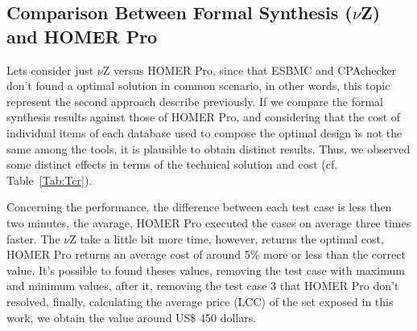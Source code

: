 \documentclass[10pt,journal,compsoc]{IEEEtran}
\begin{document}
\subsection{Comparison Between Formal Synthesis ($\nu$Z) and HOMER Pro}
\color{blue}
Lets consider just $\nu$Z versus HOMER Pro, since that ESBMC and CPAchecker don't found a optimal solution in common scenario, in other words, this topic represent the second approach describe previously. If we compare the formal synthesis results against those of HOMER Pro, and considering that the cost of individual items of each database used to compose the optimal design is not the same among the tools, it is plausible to obtain distinct results. Thus, we observed some distinct effects in terms of the technical solution and cost (cf. Table~\ref{Tab:Tcr}). 

Concerning the performance, the difference between each test case is less then two minutes, the avarage, HOMER Pro executed the cases on average three times faster. The $\nu$Z take a little bit more time, however, returns the optimal cost, HOMER Pro returns an average cost of around 5\% more or less than the correct value. It's possible to found theses values, removing the test case with maximum and minimum values, after it, removing the test case 3 that HOMER Pro don’t resolved, finally, calculating the average price (LCC) of the set exposed in this work, we obtain the value around US\$ 450 dollars.
\end{document}
